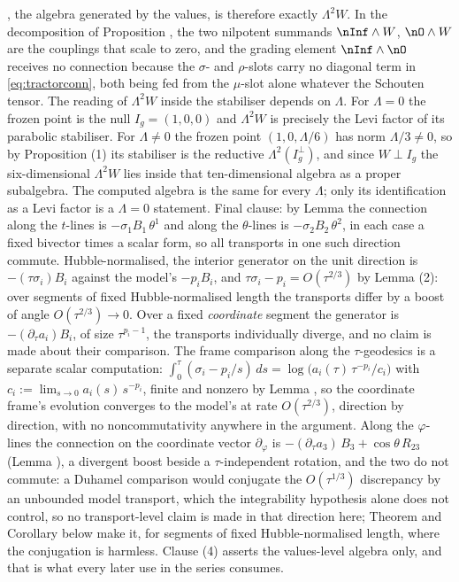 , the algebra generated by the values, is therefore exactly $\Lambda^2 W$. In the decomposition of Proposition , the two nilpotent summands $\nInf\wedge W$, $\nO\wedge W$ are the couplings that scale to zero, and the grading element $\nInf \wedge \nO$ receives no connection because the $\sigma$- and $\rho$-slots carry no diagonal term in \eqref{eq:tractorconn}, both being fed from the $\mu$-slot alone whatever the Schouten tensor. The reading of $\Lambda^2 W$ inside the stabiliser depends on $\Lambda$. For $\Lambda = 0$ the frozen point is the null $I_g = (1,0,0)$ and $\Lambda^2 W$ is precisely the Levi factor of its parabolic stabiliser. For $\Lambda \neq 0$ the frozen point $(1, 0, \Lambda/6)$ has norm $\Lambda/3 \neq 0$, so by Proposition (1) its stabiliser is the reductive $\Lambda^2(I_g^\perp)$, and since $W \perp I_g$ the six-dimensional $\Lambda^2 W$ lies inside that ten-dimensional algebra as a proper subalgebra. The computed algebra is the same for every $\Lambda$; only its identification as a Levi factor is a $\Lambda = 0$ statement. Final clause: by Lemma  the connection along the $t$-lines is $-\sigma_1 B_1\,\theta^1$ and along the $\theta$-lines is $-\sigma_2 B_2\,\theta^2$, in each case a fixed bivector times a scalar form, so all transports in one such direction commute. Hubble-normalised, the interior generator on the unit direction is $-(\tau\sigma_i)B_i$ against the model's $-p_iB_i$, and $\tau\sigma_i - p_i = O(\tau^{2/3})$ by Lemma (2): over segments of fixed Hubble-normalised length the transports differ by a boost of angle $O(\tau^{2/3}) \to 0$. Over a fixed \emph{coordinate} segment the generator is $-(\partial_\tau a_i)B_i$, of size $\tau^{p_i - 1}$, the transports individually diverge, and no claim is made about their comparison. The frame comparison along the $\tau$-geodesics is a separate scalar computation: $\int_0^\tau(\sigma_i - p_i/s)\,ds = \log\bigl(a_i(\tau)\,\tau^{-p_i}/c_i\bigr)$ with $c_i := \lim_{s \to 0} a_i(s)\,s^{-p_i}$, finite and nonzero by Lemma , so the coordinate frame's evolution converges to the model's at rate $O(\tau^{2/3})$, direction by direction, with no noncommutativity anywhere in the argument. Along the $\varphi$-lines the connection on the coordinate vector $\partial_\varphi$ is $-(\partial_\tau a_3)\,B_3 + \cos\theta\,R_{23}$ (Lemma ), a divergent boost beside a $\tau$-independent rotation, and the two do not commute: a Duhamel comparison would conjugate the $O(\tau^{1/3})$ discrepancy by an unbounded model transport, which the integrability hypothesis alone does not control, so no transport-level claim is made in that direction here; Theorem  and Corollary  below make it, for segments of fixed Hubble-normalised length, where the conjugation is harmless. Clause (4) asserts the values-level algebra only, and that is what every later use in the series consumes.
